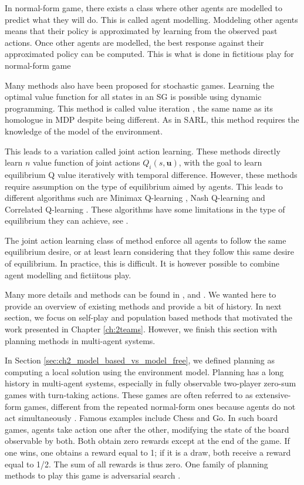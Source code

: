 In normal-form game, there exists a class where other agents are modelled to predict what they will do.
This is called agent modelling.
Moddeling other agents means that their policy is approximated by learning from the observed past actions.
Once other agents are modelled, the best response against their approximated policy can be computed.
This is what is done in fictitious play \citep{brown1951iterative} for normal-form game

Many methods also have been proposed for stochastic games.
Learning the optimal value function for all states in an SG is possible using dynamic programming.
This method is called value iteration \citep{stochasticGames}, the same name as its homologue in MDP \citep{sutton2018reinforcement} despite being different.
As in SARL, this method requires the knowledge of the model of the environment.

This leads to a variation called joint action learning.
These methods directly learn $n$ value function of joint actions $Q_i(s, \mathbf{u})$, with the goal to learn equilibrium Q value iteratively with temporal difference.
However, these methods require assumption on the type of equilibrium aimed by agents.
This leads to different algorithms such are Minimax Q-learning \citep{MarkovGames}, Nash Q-learning \citep{hu2003nash} and Correlated Q-learning \citep{greenwald2003correlated}.
These algorithms have some limitations in the type of equilibrium they can achieve, see \citep{marl-book}.

The joint action learning class of method enforce all agents to follow the same equilibrium desire, or at least learn considering that they follow this same desire of equilibrium.
In practice, this is difficult.
It is however possible to combine agent modelling and fictiitous play.

Many more details and methods can be found in \citep{marl-book}, \citep{Nowe2012GTMARL} and \citep{russel2010}.
We wanted here to provide an overview of existing methods and provide a bit of history.
In next section, we focus on self-play and population based methods that motivated the work presented in Chapter \ref{ch:2teams}.
However, we finish this section with planning methods in multi-agent systems.

In Section \ref{sec:ch2_model_based_vs_model_free}, we defined planning as computing a local solution using the environment model.
Planning has a long history in multi-agent systems, especially in fully observable two-player zero-sum games with turn-taking actions.
These games are often referred to as extensive-form games, different from the repeated normal-form ones because agents do not act simultaneously \citep{Nowe2012GTMARL}.
Famous examples include Chess and Go.
In such board games, agents take action one after the other, modifying the state of the board observable by both.
Both obtain zero rewards except at the end of the game. 
If one wins, one obtains a reward equal to 1; if it is a draw, both receive a reward equal to 1/2.
The sum of all rewards is thus zero.
One family of planning methods to play this game is adversarial search \citep{russel2010}.


